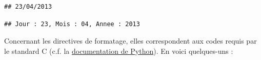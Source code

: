 \documentclass[12pt,]{book}
\newenvironment{Shaded}{\begin{snugshade}}{\end{snugshade}}
\newcommand{\SpecialCharTok}[1]{\textcolor[rgb]{0.00,0.00,0.00}{#1}}
\newcommand{\StringTok}[1]{\textcolor[rgb]{0.31,0.60,0.02}{#1}}
\newcommand{\BuiltInTok}[1]{#1}
\newcommand{\NormalTok}[1]{#1}
\numberwithin{equation}{section}
\numberwithin{countremarque}{section}
\begin{document}
\begin{Shaded}
\end{Shaded}

\begin{lstlisting}
## 23/04/2013
\end{lstlisting}

\begin{Shaded}
\end{Shaded}

\begin{lstlisting}
## Jour : 23, Mois : 04, Annee : 2013
\end{lstlisting}

Concernant les directives de formatage, elles correspondent aux codes
requis par le standard C (c.f. la
\href{https://docs.python.org/fr/3/library/datetime.html\#strftime-strptime-behavior}{documentation
de Python}). En voici quelques-uns :
\end{document}
